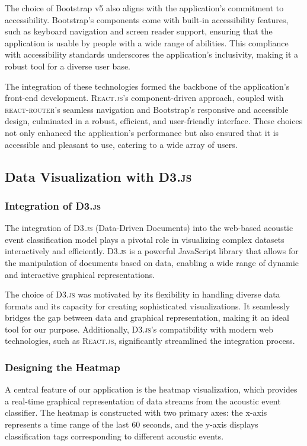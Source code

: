 The choice of Bootstrap v5 also aligns with the application’s commitment to accessibility. Bootstrap’s components come with built-in accessibility features, such as keyboard navigation and screen reader support, ensuring that the application is usable by people with a wide range of abilities. This compliance with accessibility standards underscores the application's inclusivity, making it a robust tool for a diverse user base.

The integration of these technologies formed the backbone of the application's front-end development. \textsc{React.js}'s component-driven approach, coupled with \textsc{react-router}'s seamless navigation and Bootstrap's responsive and accessible design, culminated in a robust, efficient, and user-friendly interface. These choices not only enhanced the application's performance but also ensured that it is accessible and pleasant to use, catering to a wide array of users.

\subsection{Data Visualization with \textsc{D3.js}}
\subsubsection{Integration of \textsc{D3.js}}
The integration of \textsc{D3.js} (Data-Driven Documents) into the web-based acoustic event classification model plays a pivotal role in visualizing complex datasets interactively and efficiently. \textsc{D3.js} is a powerful JavaScript library that allows for the manipulation of documents based on data, enabling a wide range of dynamic and interactive graphical representations.

The choice of \textsc{D3.js} was motivated by its flexibility in handling diverse data formats and its capacity for creating sophisticated visualizations. It seamlessly bridges the gap between data and graphical representation, making it an ideal tool for our purpose. Additionally, \textsc{D3.js}'s compatibility with modern web technologies, such as \textsc{React.js}, significantly streamlined the integration process.

\subsubsection{Designing the Heatmap}
A central feature of our application is the heatmap visualization, which provides a real-time graphical representation of data streams from the acoustic event classifier. The heatmap is constructed with two primary axes: the x-axis represents a time range of the last 60 seconds, and the y-axis displays classification tags corresponding to different acoustic events.

